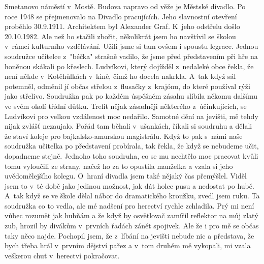 
Smetanovo náměstí v~Mostě. Budova napravo od věže je Městské divadlo.
Po roce 1948 se přejmenovalo na Divadlo pracujících. Jeho slavnostní
otevření proběhlo 30.9.1911. Architektem byl Alexander Graf. K~jeho
odstřelu došlo 20.10.1982. Ale než ho stačili zbořit, několikrát jsem
ho navštívil se školou v~rámci kulturního vzdělávání. Užili jsme si
tam ovšem i spoustu legrace. Jednou soudružce učitelce z~"béčka"
strašně vadilo, že jsme před představením při hře na honěnou skákali
po křeslech. Ludvíkovi, který dojížděl z~nedaleké obce řekla, že není
někde v~Kotěhůlkách v~kině, čímž ho docela nakrkla. A~tak když sál
potemněl, odměnil jí občas střelou z~flusačky z~krajónu, do které
používal rýži jako střelivo. Soudružka pak po každém úspěšném zásahu
slíbila někomu dalšímu ve svém okolí třídní důtku. Trefit nějak
zásadněji některého z~účinkujících, se Ludvíkovi pro velkou vzdálenost
moc nedařilo. Samotné dění na jevišti, mě tehdy nijak zvlášť
nezaujalo. Pořád tam běhali v~ušankách, říkali si soudruhu a dělali že
staví koleje pro bajkalsko-amurskou magistrálu. Když to pak s~námi
naše soudružka učitelka po představení probírala, tak řekla, že když
se nebudeme učit, dopadneme stejně. Jednoho toho soudruha, co se mu
nechtělo moc pracovat kvůli tomu vyloučili ze strany, načež ho za to
opustila manželka a vzala si jeho uvědomělejšího kolegu. O~hraní
divadla jsem také nějaký čas přemýšlel. Viděl jsem to v~té době jako
jedinou možnost, jak dát holce pusu a nedostat po hubě. A~tak když se
ve škole dělal nábor do dramatického kroužku, zvedl jsem ruku. Ta
soudružka co to vedla, ale mé nadšení pro herectví rychle zchladila.
Prý mi není vůbec rozumět jak huhňám a že když by osvětlovač zamířil
reflektor na můj zlatý zub, hrozil by divákům v~prvních řadách zánět
spojivek. Ale že i pro mě se občas taky něco najde. Pochopil jsem, že
z~líbání na jevišti nebude nic a představa, že bych třeba hrál
v~prvním dějství pařez a v~tom druhém mě vykopali, mi vzala veškerou
chuť v~herectví pokračovat.
